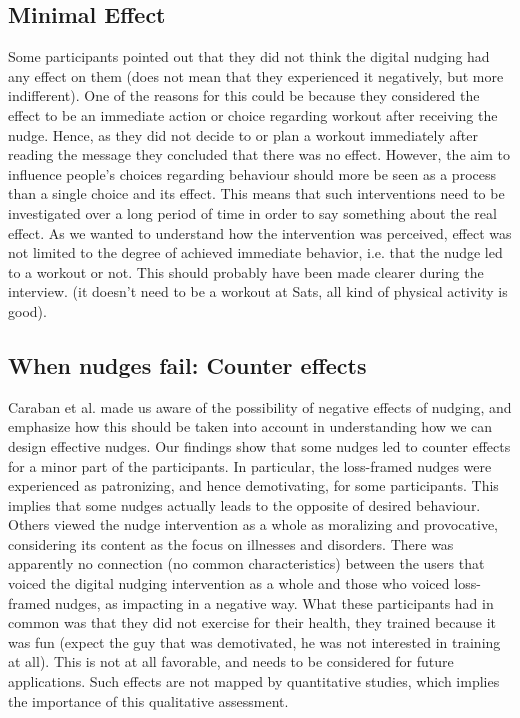\subsection{Minimal Effect}
Some participants pointed out that they did not think the digital nudging had any effect on them (does not mean that they experienced it negatively, but more indifferent). One of the reasons for this could be because they considered the effect to be an immediate action or choice regarding workout after receiving the nudge. Hence, as they did not decide to or plan a workout immediately after reading the message they concluded that there was no effect. However, the aim to influence people's choices regarding behaviour should more be seen as a process than a single choice and its effect. This means that such interventions need to be investigated over a long period of time in order to say something about the real effect. As we wanted to understand how the intervention was perceived, effect was not limited to the degree of achieved immediate behavior, i.e. that the nudge led to a workout or not. This should probably have been made clearer during the interview. (it doesn't need to be a workout at Sats, all kind of physical activity is good).

\subsection{When nudges fail: Counter effects}
Caraban et al. \cite{caraban_23_2019} made us aware of the possibility of negative effects of nudging, and emphasize how this should be taken into account in understanding how we can design effective nudges. Our findings show that some nudges led to counter effects for a minor part of the participants. In particular, the loss-framed nudges were experienced as patronizing, and hence demotivating, for some participants. This implies that some nudges actually leads to the opposite of desired behaviour. Others viewed the nudge intervention as a whole as moralizing and provocative, considering its content as the focus on illnesses and disorders. There was apparently no connection (no common characteristics) between the users that voiced the digital nudging intervention as a whole and those who voiced loss-framed nudges, as impacting in a negative way. What these participants had in common was that they did not exercise for their health, they trained because it was fun (expect the guy that was demotivated, he was not interested in training at all). This is not at all favorable, and needs to be considered for future applications. Such effects are not mapped by quantitative studies, which implies the importance of this qualitative assessment.  


